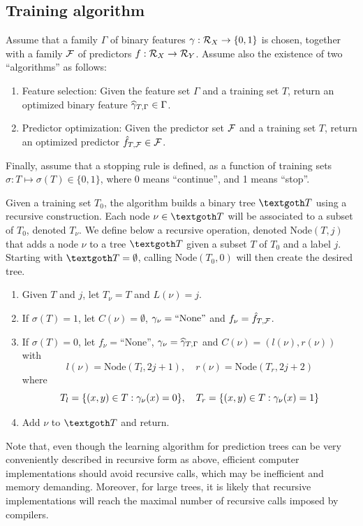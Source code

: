\subsection{Training algorithm}
Assume that  a family $\Gamma$ of binary features $\gamma: {\mathcal R}_X \to \{0,1\}$ is chosen, together with 
 a family ${\mathcal F}$ of predictors $f: {\mathcal R}_X \to {\mathcal R}_Y$.
Assume also the existence of two ``algorithms'' as follows:
\begin{enumerate}[label=$\bullet$]
\item Feature selection: Given the feature set $\Gamma$ and a training set $T$, return an optimized binary feature $\widehat \gamma_{T, \Gamma} \in \Gamma$.
\item Predictor optimization: Given the predictor set ${\mathcal F}$ and a training set $T$, return an optimized predictor ${\hat{f}}_{T, {\mathcal F}}\in {\mathcal F}$.
\end{enumerate}
 Finally, assume that a stopping rule is defined, as a  function of training sets $\sigma: T \mapsto \sigma(T)\in \{0, 1\}$, where  0 means ``continue'', and 1 means ``stop''.

 Given a training set $T_0$, the algorithm builds a binary tree $\CTR$ using a recursive construction.
 Each node $\nu\in \CTR$ will  be associated to a subset of $T_0$, denoted $T_\nu$.
 We  define below a recursive operation, denoted $\mathrm{Node}(T, j)$ that adds a node $\nu$ to a tree $\CTR$ given a subset $T$ of $T_0$ and a label $j$.
 Starting with $\CTR= \emptyset$, calling $\mathrm{Node}(T_0, 0)$ will then create the desired tree. 

\begin{algorithm}
\begin{enumerate}[label=(\alph*)]
\item Given $T$ and $j$, let $T_\nu = T$ and $L(\nu) = j$.
\item If $\sigma(T) = 1$, let $C(\nu) = \emptyset$, $\gamma_\nu =\text{``None''}$ and $f_\nu = {\hat{f}}_{T, {\mathcal F}}$.
\item If $\sigma(T) = 0$, let $f_\nu =\text{``None''}$, $\gamma_\nu = \widehat {\gamma}_{T, \Gamma}$ and $C(\nu) = (l(\nu), r(\nu))$ with 
\[
l(\nu) = \mathrm{Node}(T_l, 2j+1), \quad r(\nu) = \mathrm{Node}(T_r, 2j+2)
\]
where 
\[
T_l = \{(x,y)\in T: \gamma_\nu(x) = 0\}, \quad
T_r = \{(x,y)\in T: \gamma_\nu(x) = 1\}
\]
\item Add $\nu$ to $\CTR$ and return.
\end{enumerate}
\end{algorithm}

\begin{remark}
Note that, even though the learning algorithm for prediction trees can be very conveniently described in recursive form as above, efficient computer implementations should avoid recursive calls, which may be inefficient and memory demanding. Moreover, for large trees, it is likely that recursive implementations will reach the maximal number  of recursive calls imposed by compilers.
\end{remark}

